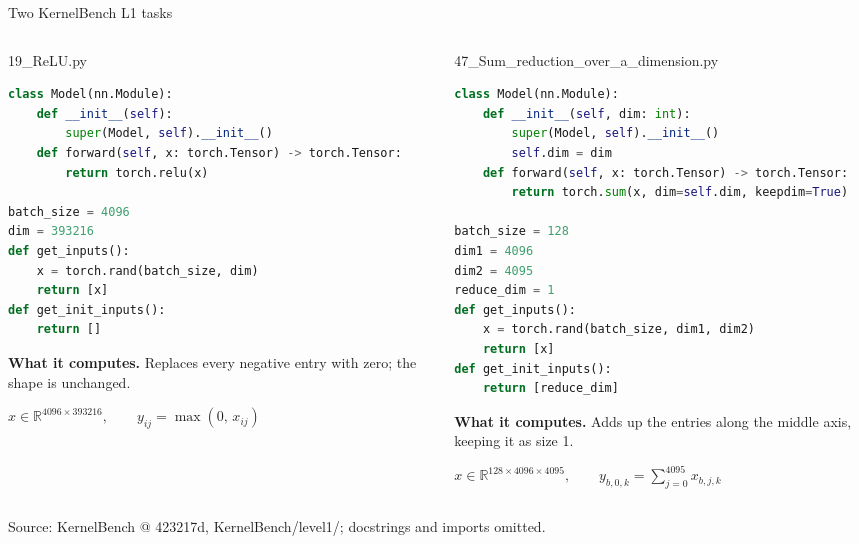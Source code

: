 \documentclass[aspectratio=169,10pt]{beamer}
\newcommand{\code}[1]{{\ttfamily #1}}
\newcommand{\hd}[1]{\textbf{\color{lgTeal}#1}}
\begin{document}
\begin{frame}[fragile]{Two KernelBench L1 tasks}

\begin{columns}[T]
\begin{column}{0.48\textwidth}
\begin{codebox}{19\_ReLU.py}
\begin{lstlisting}[language=Python, basicstyle=\ttfamily\tiny\color{lgInk}]
class Model(nn.Module):
    def __init__(self):
        super(Model, self).__init__()
    def forward(self, x: torch.Tensor) -> torch.Tensor:
        return torch.relu(x)

batch_size = 4096
dim = 393216
def get_inputs():
    x = torch.rand(batch_size, dim)
    return [x]
def get_init_inputs():
    return []
\end{lstlisting}
\end{codebox}

\vspace{2pt}
{\scriptsize
\hd{What it computes.} Replaces every negative entry with zero; the shape is unchanged.
\par\vspace{3pt}\centerline{$x \in \mathbb{R}^{4096 \times 393216}, \qquad y_{ij} = \max(0,\, x_{ij})$}
}
\end{column}

\begin{column}{0.48\textwidth}
\begin{codebox}{47\_Sum\_reduction\_over\_a\_dimension.py}
\begin{lstlisting}[language=Python, basicstyle=\ttfamily\tiny\color{lgInk}]
class Model(nn.Module):
    def __init__(self, dim: int):
        super(Model, self).__init__()
        self.dim = dim
    def forward(self, x: torch.Tensor) -> torch.Tensor:
        return torch.sum(x, dim=self.dim, keepdim=True)

batch_size = 128
dim1 = 4096
dim2 = 4095
reduce_dim = 1
def get_inputs():
    x = torch.rand(batch_size, dim1, dim2)
    return [x]
def get_init_inputs():
    return [reduce_dim]
\end{lstlisting}
\end{codebox}

\vspace{2pt}
{\scriptsize
\hd{What it computes.} Adds up the entries along the middle axis, keeping it as size 1.
\par\vspace{3pt}\centerline{$x \in \mathbb{R}^{128 \times 4096 \times 4095}, \qquad y_{b,0,k} = \sum_{j=0}^{4095} x_{b,j,k}$}
}
\end{column}
\end{columns}

\vfill
{\tiny\color{lgGrey} Source: KernelBench @ \code{423217d}, \code{KernelBench/level1/}; docstrings and imports omitted.}

\end{frame}
\end{document}
